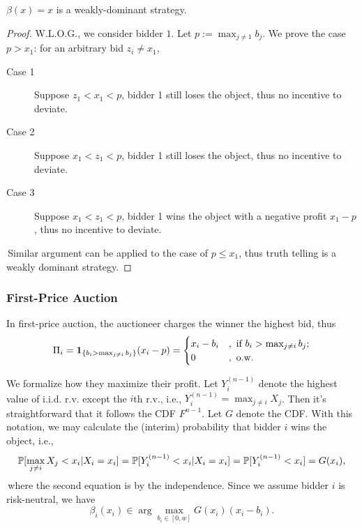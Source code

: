 \begin{theorem}
    $\beta(x)=x$ is a weakly-dominant strategy.
\end{theorem}
\begin{proof}
W.L.O.G., we consider bidder $1$. Let $p:=\max_{j\neq 1}b_j$. We prove the case $p>x_1$: for an arbitrary bid $z_i\neq x_1$,
\begin{description}
    \item[Case 1] Suppose $z_1<x_1<p$, bidder 1 still loses the object, thus no incentive to deviate.
    \item[Case 2] Suppose $x_1<z_1<p$, bidder 1 still loses the object, thus no incentive to deviate.
    \item[Case 3] Suppose $x_1<z_1<p$, bidder 1 wins the object with a negative profit $x_1-p$, thus no incentive to deviate.
\end{description}
\,Similar argument can be applied to the case of $p\leq x_1$, thus truth telling is a weakly dominant strategy.
\end{proof}

\subsubsection{First-Price Auction}
In first-price auction, the auctioneer charges the winner the highest bid, thus
$$\Pi_i = \mathbf{1}_{\{b_i>\max_{j\neq i}b_j\}}(x_i-p)=\begin{cases}
    x_i-b_i &,\text{ if } b_i>\max_{j\neq i}b_j;\\
    0 &,\text{ o.w.}
\end{cases}$$

We formalize how they maximize their profit. 
Let $Y_i^{(n-1)}$ denote the highest value of i.i.d. r.v. except the $i$th r.v., i.e., $Y_i^{(n-1)}=\max_{j\neq i}X_j$. Then it's straightforward that it follows the CDF $F^{n-1}$. Let $G$ denote the CDF.
With this notation, we may calculate the (interim) probability that bidder $i$ wins the object, i.e., $$\mathbb{P}[\max_{j\neq i} X_j < x_i|X_i=x_i]=\mathbb{P}[Y_i^{(n-1)}< x_i|X_i=x_i]=\mathbb{P}[Y_i^{(n-1)}< x_i]=G(x_i),$$
\,where the second equation is by the independence. Since we assume bidder $i$ is risk-neutral, we have $$\beta_i(x_i)\in\arg \max_{b_i\in [0,w]} G(x_i)(x_i-b_i).$$

